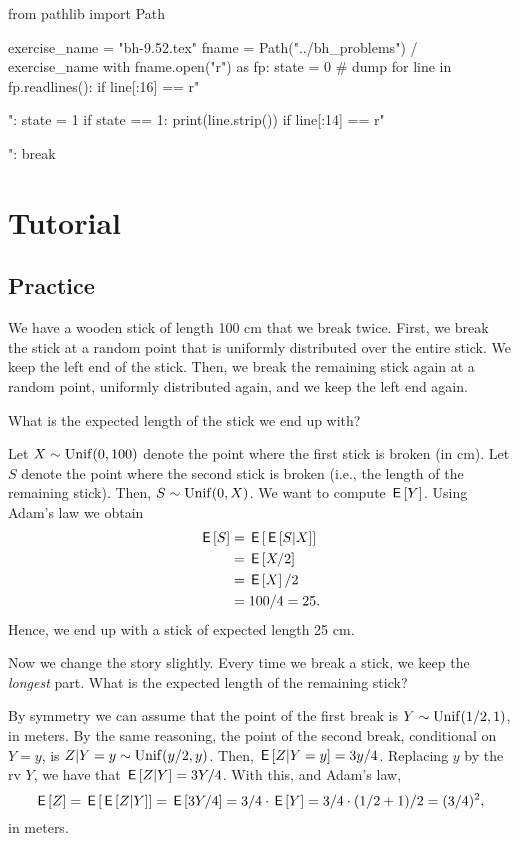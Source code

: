 \begin{pycode}
from pathlib import Path

exercise_name = "bh-9.52.tex"
fname = Path("../bh_problems") / exercise_name
with fname.open("r") as fp:
    state = 0  # dump
    for line in fp.readlines():
        if line[:16] == r"\begin{exercise}":
            state = 1
        if state == 1:
            print(line.strip())
        if line[:14] == r"\end{exercise}":
            break
\end{pycode}


\section{Tutorial}
\label{sec:tutorial}


\subsection{Practice}

We have a wooden stick of length 100 cm that we break twice.
First, we break the stick at a random point that is uniformly distributed over the entire stick.
We keep the left end of the stick.
Then, we break the remaining stick again at a random point, uniformly distributed again, and we keep the left end again.

\begin{exercise}
What is the expected length of the stick we end up with?
\begin{solution}
Let $X \sim \mathrm{Unif}(0,100)$ denote the point where the first stick is broken (in cm). Let $S$ denote the point where the second stick is broken (i.e., the length of the remaining stick). Then, $S \sim \mathrm{Unif}(0,X)$. We want to compute $\,\mathsf{E}\left[Y\right]$. Using Adam's law we obtain
\begin{align}
    \,\mathsf{E}\left[S\right] &= \,\mathsf{E}\left[\,\mathsf{E}\left[S|X\right]\right] \\
    &= \,\mathsf{E}\left[X/2\right] \\
    &= \,\mathsf{E}\left[X\right]/2 \\
    &= 100/4 = 25.
\end{align}
Hence, we end up with a stick of expected length 25 cm.
\end{solution}
\end{exercise}

\begin{exercise}
Now we change the story slightly. Every time we break a stick, we keep the \textit{longest} part. What is the expected length of the remaining stick?
\begin{solution}
By symmetry we can assume that the point of the first break is $Y\sim\mathrm{Unif}(1/2, 1)$, in meters. By the same reasoning, the point of the second break, conditional on $Y=y$, is $Z|Y=y \sim \mathrm{Unif}(y/2, y)$. Then, $\,\mathsf{E}\left[Z|Y=y\right] = 3y/4$. Replacing $y$ by the rv $Y$, we have that $\,\mathsf{E}\left[Z|Y\right] = 3 Y/4$. With this, and Adam's law,
\begin{equation}
\,\mathsf{E}\left[Z\right] = \,\mathsf{E}\left[\,\mathsf{E}\left[Z|Y\right]\right] = \,\mathsf{E}\left[3Y/4\right] = 3/4\cdot \,\mathsf{E}\left[Y\right]= 3/4\cdot (1/2+1)/2 = (3/4)^{2},
\end{equation}
in meters.

\end{solution}
\end{exercise}


